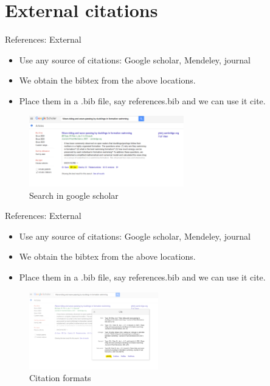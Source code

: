 \section{External citations}
\label{sec:referencing}
\frame[plain]{\sectionpage}
\begin{frame}{References: External}
 \begin{itemize}
     \item Use any source of citations: Google scholar, Mendeley, journal
     \item We obtain the bibtex from the above locations.
     \item Place them in a .bib file, say references.bib and we can use it cite.
 \end{itemize}
 \begin{figure}
     \centering
     \includegraphics[width=0.6\textwidth]{sections/citation01.PNG}
     \caption{Search in google scholar}
     \label{fig:cite_step01}
 \end{figure}
\end{frame}

\begin{frame}{References: External}
 \begin{itemize}
     \item Use any source of citations: Google scholar, Mendeley, journal
     \item We obtain the bibtex from the above locations.
     \item Place them in a .bib file, say references.bib and we can use it cite.
 \end{itemize}
 \begin{figure}
     \centering
     \includegraphics[width=0.5\textwidth]{sections/citation02.PNG}
     \caption{Citation formats}
     \label{fig:cite_step01}
 \end{figure}
\end{frame}

